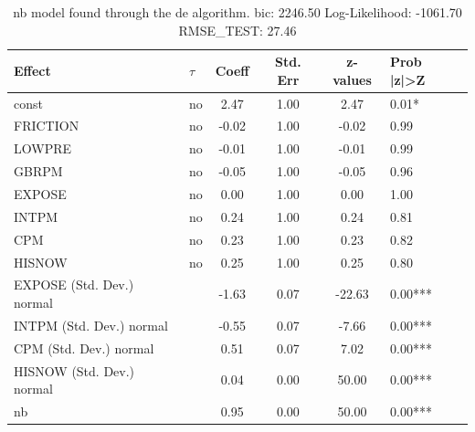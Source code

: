\begin{table}
	\caption{nb model found through the de algorithm. bic: 2246.50 Log-Likelihood: -1061.70 RMSE_TEST: 27.46}
	\begin{center}
		\begin{tabular}{|l|l|c|c|c|l|}
			\hline
			Effect & $\tau$ & Coeff & Std. Err & z-values & Prob |z|>Z \\
			\hline
			const & no & 2.47 & 1.00 & 2.47 & 0.01* \\
			\hline
			FRICTION & no & -0.02 & 1.00 & -0.02 & 0.99 \\
			\hline
			LOWPRE & no & -0.01 & 1.00 & -0.01 & 0.99 \\
			\hline
			GBRPM & no & -0.05 & 1.00 & -0.05 & 0.96 \\
			\hline
			EXPOSE & no & 0.00 & 1.00 & 0.00 & 1.00 \\
			\hline
			INTPM & no & 0.24 & 1.00 & 0.24 & 0.81 \\
			\hline
			CPM & no & 0.23 & 1.00 & 0.23 & 0.82 \\
			\hline
			HISNOW & no & 0.25 & 1.00 & 0.25 & 0.80 \\
			\hline
			EXPOSE (Std. Dev.) normal &  & -1.63 & 0.07 & -22.63 & 0.00*** \\
			\hline
			INTPM (Std. Dev.) normal &  & -0.55 & 0.07 & -7.66 & 0.00*** \\
			\hline
			CPM (Std. Dev.) normal &  & 0.51 & 0.07 & 7.02 & 0.00*** \\
			\hline
			HISNOW (Std. Dev.) normal &  & 0.04 & 0.00 & 50.00 & 0.00*** \\
			\hline
			nb &  & 0.95 & 0.00 & 50.00 & 0.00*** \\
			\hline
		\end{tabular}
	\end{center}
\end{table}
